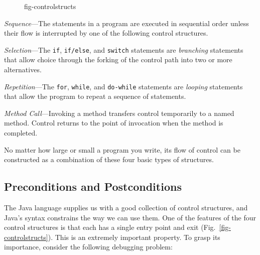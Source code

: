 \begin{figure}[hbt]
{fig-controlstructs}

\end{figure}

\begin{BL}
\item  {\it Sequence}---The statements in a program are executed in
sequential order unless their flow is interrupted by one of the
following control structures.

\item  {\it Selection}---The {\tt if}, {\tt if/else}, and {\tt switch}
statements are {\it branching} statements that allow choice through
the forking of the control path into two or more alternatives.

\item  {\it Repetition}---The {\tt for}, {\tt while}, and {\tt do-while}
statements are {\it looping} statements that allow the program to
repeat a sequence of statements.

\item  {\it Method Call}---Invoking a method transfers control temporarily
to a named method. Control returns to the point of invocation when the
method is completed.

\end{BL}

\noindent No matter how large or small a program you write, its flow of
control can be constructed as a combination of these four basic types
of structures.






\subsection*{Preconditions and Postconditions}
\noindent The Java language supplies us with a good collection of control
structures, and Java's syntax constrains the way we can use them. One of
the features of the four control structures is that each has a single
entry point and exit (Fig.~\ref{fig-controlstructs}). This is an
extremely important property. To grasp its importance, consider the
following debugging problem:

